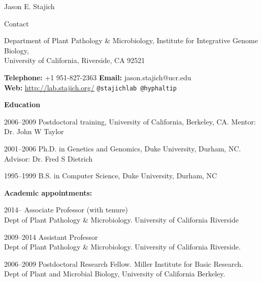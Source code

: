 \documentclass[10pt]{article}
\begin{document}


\newlength{\oldcvlabelwidth}
\renewcommand*{\cvbibname}{}

\begin{cv}{\centerline{Jason E. Stajich}}


\setlength{\cvlabelwidth}{18mm}
\begin{cvlistcompact}{Contact}
\item{Department of Plant Pathology \& Microbiology, Institute for
  Integrative Genome Biology, \\
  University of California, Riverside, CA 92521}
  \item{ \textbf{Telephone:} +1 951-827-2363 \textbf{Email:}
    jason.stajich@ucr.edu \\
    \textbf{Web:} \url{http://lab.stajich.org/} {\tt @stajichlab @hyphaltip}}
\end{cvlistcompact}

\begin{cvlistcompact}{\bf Education}
\item [2006--2009] Postdoctoral training, University of California, Berkeley, CA. Mentor: Dr. John W Taylor
\item [2001--2006] Ph.D. in Genetics and Genomics, Duke University, Durham, NC. Advisor: Dr. Fred S Dietrich
\item [1995--1999] B.S. in Computer Science, Duke University, Durham, NC
\end{cvlistcompact}

\begin{cvlistcompact}{\bf Academic appointments:}
\item [2014--] Associate Professor (with tenure)
  \\ Dept of Plant Pathology \& Microbiology. University of California Riverside
\item [2009--2014] Assistant Professor
  \\ Dept of Plant Pathology \& Microbiology. University of California Riverside.
\item [2006--2009] Postdoctoral Research Fellow. Miller Institute for Basic Research. \\
  Dept of Plant and Microbial Biology, University of California
  Berkeley. \\
\end{cvlistcompact}


\end{cv}
\end{document}
